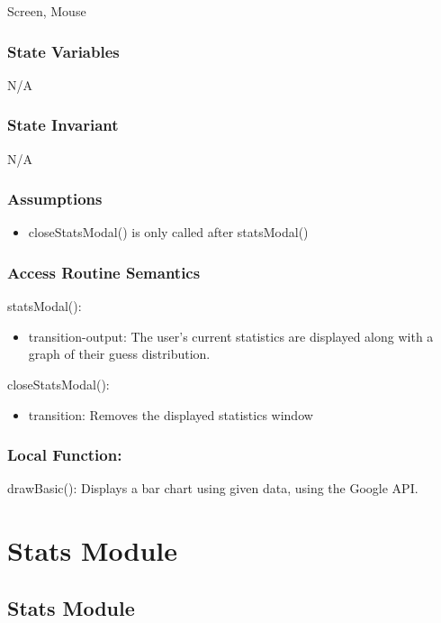 \documentclass[12pt]{article}
\begin{document}
Screen, Mouse

\subsubsection* {State Variables}
N/A

\subsubsection* {State Invariant}

N/A

\subsubsection* {Assumptions}

\begin{itemize}
\item closeStatsModal() is only called after statsModal()
\end{itemize}

\subsubsection* {Access Routine Semantics}

\noindent statsModal():
\begin{itemize}
  \item transition-output: The user's current statistics are displayed along with a graph of their guess distribution.
\end{itemize}

\noindent closeStatsModal():
\begin{itemize}
\item transition: Removes the displayed statistics window
\end{itemize}

\subsubsection*{Local Function:}

drawBasic(): Displays a bar chart using given data, using the Google API.

\newpage

\section {Stats Module}

\subsection* {Stats Module}
\end{document}
